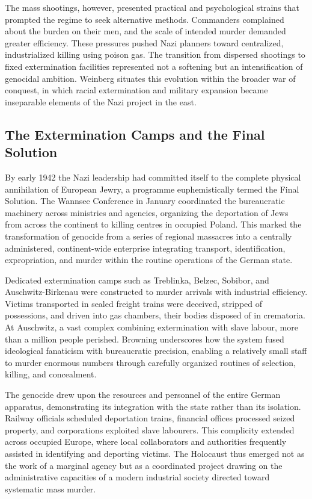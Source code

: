 The mass shootings, however, presented practical and psychological strains that prompted the regime to seek alternative methods. Commanders complained about the burden on their men, and the scale of intended murder demanded greater efficiency. These pressures pushed Nazi planners toward centralized, industrialized killing using poison gas. The transition from dispersed shootings to fixed extermination facilities represented not a softening but an intensification of genocidal ambition. Weinberg situates this evolution within the broader war of conquest, in which racial extermination and military expansion became inseparable elements of the Nazi project in the east. \cite{browning2004} \cite{weinberg1994} \cite{hastings2011}

\subsection{The Extermination Camps and the Final Solution}
By early 1942 the Nazi leadership had committed itself to the complete physical annihilation of European Jewry, a programme euphemistically termed the Final Solution. The Wannsee Conference in January coordinated the bureaucratic machinery across ministries and agencies, organizing the deportation of Jews from across the continent to killing centres in occupied Poland. This marked the transformation of genocide from a series of regional massacres into a centrally administered, continent-wide enterprise integrating transport, identification, expropriation, and murder within the routine operations of the German state.

Dedicated extermination camps such as Treblinka, Belzec, Sobibor, and Auschwitz-Birkenau were constructed to murder arrivals with industrial efficiency. Victims transported in sealed freight trains were deceived, stripped of possessions, and driven into gas chambers, their bodies disposed of in crematoria. At Auschwitz, a vast complex combining extermination with slave labour, more than a million people perished. Browning underscores how the system fused ideological fanaticism with bureaucratic precision, enabling a relatively small staff to murder enormous numbers through carefully organized routines of selection, killing, and concealment.

The genocide drew upon the resources and personnel of the entire German apparatus, demonstrating its integration with the state rather than its isolation. Railway officials scheduled deportation trains, financial offices processed seized property, and corporations exploited slave labourers. This complicity extended across occupied Europe, where local collaborators and authorities frequently assisted in identifying and deporting victims. The Holocaust thus emerged not as the work of a marginal agency but as a coordinated project drawing on the administrative capacities of a modern industrial society directed toward systematic mass murder.

